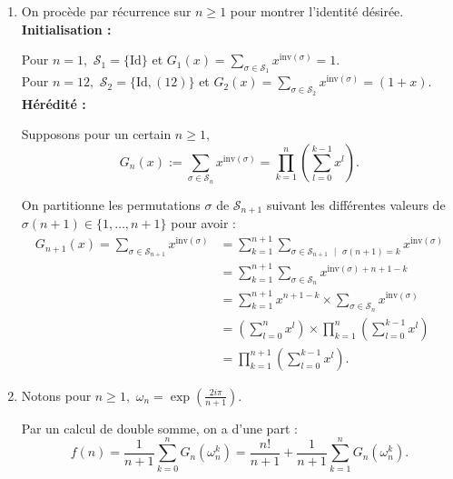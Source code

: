 \begin{enumerate}
\item On procède par récurrence sur $n\geq 1$ pour montrer l'identité désirée.\\

\textbf{Initialisation :}

Pour $n=1,$ $\displaystyle \mathcal{S}_{1}=\{\mbox{Id}\}$ et $G_{1}(x)=\displaystyle \sum_{\sigma \in \mathcal{S}_{1}}x^{\mbox{inv}(\sigma)}=1.$\\

Pour $n=12,$ $\displaystyle \mathcal{S}_{2}=\{\mbox{Id},(12)\}$ et $\displaystyle G_{2}(x)=\sum_{\sigma \in \mathcal{S}_{2}}x^{\mbox{inv}(\sigma)}=\left( 1+x \right).$\\

\textbf{Hérédité :}

Supposons pour un certain $n\geq 1,$ $$G_{n}(x):=\sum_{\sigma\in \mathcal{S}_{n}}x^{\mbox{inv}(\sigma)}=\prod_{k=1}^{n}\left(\sum_{l=0}^{k-1}x^{l}\right).$$

On partitionne les permutations $\sigma$ de $\mathcal{S}_{n+1}$ suivant les différentes  valeurs de $\sigma(n+1)\in\{1,\ldots,n+1\}$ pour avoir :
\begin{align*}
G_{n+1}(x)=\sum_{\sigma\in \mathcal{S}_{n+1}}x^{\mbox{inv}(\sigma)} & = \sum_{k=1}^{n+1}\sum_{\sigma\in \mathcal{S}_{n+1}\mbox{ }|\mbox{ }\sigma(n+1)=k}x^{\mbox{inv}(\sigma)}\\
& = \sum_{k=1}^{n+1}\sum_{\sigma\in \mathcal{S}_{n}}x^{\mbox{inv}(\sigma)+n+1-k}\\
& = \sum_{k=1}^{n+1}x^{n+1-k} \times \sum_{\sigma\in \mathcal{S}_{n}}x^{\mbox{inv}(\sigma)}\\
& = \left( \sum_{l=0}^{n}x^{l} \right) \times \prod_{k=1}^{n}\left(\sum_{l=0}^{k-1}x^{l}\right)\\
& = \prod_{k=1}^{n+1}\left(\sum_{l=0}^{k-1}x^{l}\right).
\end{align*}

\item Notons pour $n\geq 1,$ $\displaystyle \omega_{n}=\exp(\frac{2i\pi}{n+1}).$

Par un calcul de double somme, on a d'une part :  $$f(n)=\frac{1}{n+1}\sum_{k=0}^{n}G_{n}(\omega_{n}^{k})=\frac{n!}{n+1}+\frac{1}{n+1}\sum_{k=1}^{n}G_{n}(\omega_{n}^{k}).$$


\end{enumerate}
